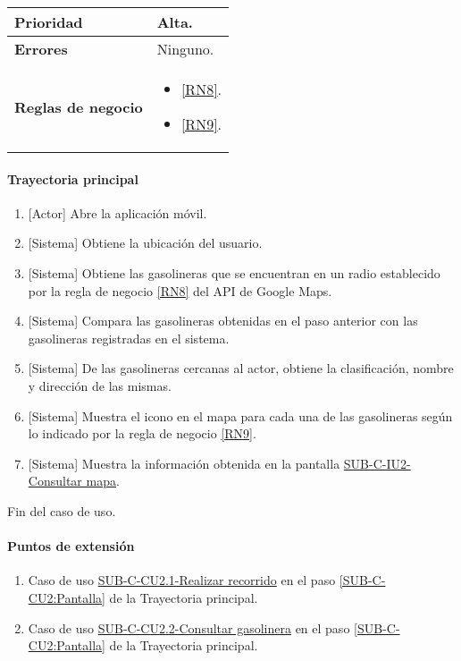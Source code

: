\begin{longtable}{|J{5cm}|J{10.3cm}|}
		\\ \hline 
	\textbf{Prioridad} & 
		Alta. \\ \hline
	\textbf{Errores} & Ninguno.
		\\ \hline
	\textbf{Reglas de negocio} & 
		\begin{itemize}
			\item \ref{RN8}.
			\item \ref{RN9}.
		\end{itemize}
		 \\ \hline
\end{longtable}

\paragraph{Trayectoria principal}
	\begin{enumerate}
		\item {[Actor]} Abre la aplicación móvil.
		\item {[Sistema]} Obtiene la ubicación del usuario.
		\item {[Sistema]} Obtiene las gasolineras que se encuentran en un radio establecido por la regla de negocio \ref{RN8} del API de Google Maps.
		\item {[Sistema]} Compara las gasolineras obtenidas en el paso anterior con las gasolineras registradas en el sistema.
		\item {[Sistema]} De las gasolineras cercanas al actor, obtiene la clasificación, nombre y dirección de las mismas.
		\item {[Sistema]} Muestra el icono en el mapa para cada una de las gasolineras según lo indicado por la regla de negocio \ref{RN9}.
		\item \label{SUB-C-CU2:Pantalla} {[Sistema]} Muestra la información obtenida en la pantalla \hyperref[fig:sub-c-iu2]{SUB-C-IU2-Consultar mapa}.
	\end{enumerate}
	Fin del caso de uso.

\paragraph{Puntos de extensión} \label{SUB-C-CU2:PE}
\begin{enumerate}[label=PE\arabic*.]
	\item Caso de uso \hyperref[SUB-C-CU2.1]{SUB-C-CU2.1-Realizar recorrido} en el paso \ref{SUB-C-CU2:Pantalla} de la Trayectoria principal.
	\item Caso de uso \hyperref[SUB-C-CU2.2]{SUB-C-CU2.2-Consultar gasolinera} en el paso \ref{SUB-C-CU2:Pantalla} de la Trayectoria principal.
\end{enumerate}
